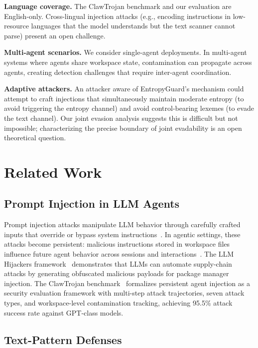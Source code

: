 \documentclass[conference]{IEEEtran}
\begin{document}
\textbf{Language coverage.} The ClawTrojan benchmark and our evaluation are English-only. Cross-lingual injection attacks (e.g., encoding instructions in low-resource languages that the model understands but the text scanner cannot parse) present an open challenge.

\textbf{Multi-agent scenarios.} We consider single-agent deployments. In multi-agent systems where agents share workspace state, contamination can propagate across agents, creating detection challenges that require inter-agent coordination.

\textbf{Adaptive attackers.} An attacker aware of EntropyGuard's mechanism could attempt to craft injections that simultaneously maintain moderate entropy (to avoid triggering the entropy channel) and avoid control-bearing lexemes (to evade the text channel). Our joint evasion analysis suggests this is difficult but not impossible; characterizing the precise boundary of joint evadability is an open theoretical question.

\section{Related Work}
\label{sec:related}

\subsection{Prompt Injection in LLM Agents}

Prompt injection attacks manipulate LLM behavior through carefully crafted inputs that override or bypass system instructions~\cite{perez2022ignore,liu2023prompt}. In agentic settings, these attacks become persistent: malicious instructions stored in workspace files influence future agent behavior across sessions and interactions~\cite{greshake2023not}. The LLM Hijackers framework~\cite{cheng2025llmhijackers} demonstrates that LLMs can automate supply-chain attacks by generating obfuscated malicious payloads for package manager injection. The ClawTrojan benchmark~\cite{zhan2024clawtrojan} formalizes persistent agent injection as a security evaluation framework with multi-step attack trajectories, seven attack types, and workspace-level contamination tracking, achieving 95.5\% attack success rate against GPT-class models.

\subsection{Text-Pattern Defenses}
\end{document}

